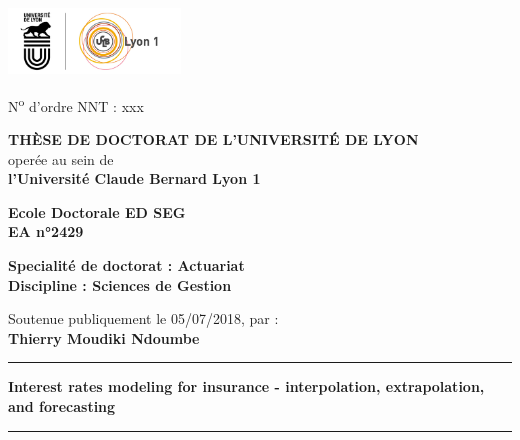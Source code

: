 %
\begin{titlepage}
\setlength{\parindent}{0pt}
\thispagestyle{empty}


\begin{center}
\includegraphics[height=1.75cm]{gfx/logo}
\end{center}


\fontsize{10pt}{12pt}\selectfont
N\textsuperscript{o} d'ordre NNT : xxx

\vspace{0.1cm}

\begin{center}
\fontsize{13pt}{15pt}\selectfont
\textbf{\uppercase{Thèse de doctorat de l'universit\'e de Lyon}}\\
\fontsize{11pt}{13pt}\selectfont
oper\'ee au sein de\\
\textbf{l'Universit\'e Claude Bernard Lyon 1}

\vspace{0.2cm}

\textbf{Ecole Doctorale ED SEG\\%
EA n°2429}%

\vspace{0.1cm}

\textbf{Specialit\'e de doctorat : Actuariat\\
Discipline : Sciences de Gestion} %

\vspace{0.1cm}

Soutenue publiquement le 05/07/2018, par :\\
\fontsize{14pt}{16pt}\selectfont
\textbf{Thierry Moudiki Ndoumbe}

\vspace{0.1cm} %

\rule[20pt]{\textwidth}{0.5pt}

\fontsize{20pt}{25pt}\selectfont
\textbf{Interest rates modeling for insurance - interpolation, extrapolation, and forecasting}

\rule{\textwidth}{0.5pt}

\vspace{0.1cm} %
\end{center}


\end{titlepage}
